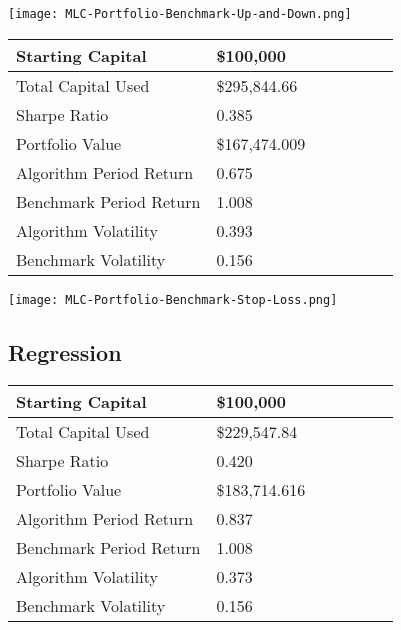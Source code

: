 \begin{center}  
    \texttt{[image: MLC-Portfolio-Benchmark-Up-and-Down.png]}
    \label{fig:nonfloat}
\end{center}

\begin{center}
    \begin{tabular}{ | l | l | l | | l | l | l | p{5cm} |}
    \hline
    Starting Capital & \$100,000 \\ \hline
    Total Capital Used & \$295,844.66 \\ \hline
    Sharpe Ratio & 0.385 \\ \hline
    Portfolio Value & \$167,474.009 \\ \hline
    Algorithm Period Return & 0.675 \\ \hline
    Benchmark Period Return & 1.008 \\ \hline
    Algorithm Volatility & 0.393 \\ \hline
    Benchmark Volatility & 0.156 \\
    \hline
    \end{tabular}
    \label{table:nonfloat}
\end{center}

\begin{center}  
    \texttt{[image: MLC-Portfolio-Benchmark-Stop-Loss.png]}
    \label{fig:nonfloat}
\end{center}

\subsection{Regression}

\begin{center}
    \begin{tabular}{ | l | l | l | | l | l | l | p{5cm} |}
    \hline
    Starting Capital & \$100,000 \\ \hline
    Total Capital Used & \$229,547.84 \\ \hline
    Sharpe Ratio & 0.420 \\ \hline
    Portfolio Value & \$183,714.616 \\ \hline
    Algorithm Period Return & 0.837 \\ \hline
    Benchmark Period Return & 1.008 \\ \hline
    Algorithm Volatility & 0.373 \\ \hline
    Benchmark Volatility & 0.156 \\
    \hline
    \end{tabular}
    \label{table:nonfloat}
\end{center}

